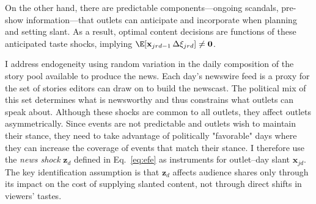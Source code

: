 \documentclass[12pt]{article}
\begin{document}
On the other hand, there are predictable components—ongoing scandals, pre-show information—that outlets can anticipate and incorporate when planning and setting slant. As a result,  optimal content decisions are functions of these anticipated taste shocks, implying $\E[\mathbf{x}_{jrd-1}\,\Delta\xi_{jrd}] \neq \mathbf{0}$.





I address endogeneity using random variation in the daily composition of the story pool available to produce the news. Each day’s newswire feed is a proxy for the set of stories editors can draw on to build the newscast. The political mix of this set determines what is newsworthy and thus constrains what outlets can speak about. Although these shocks are common to all outlets, they affect outlets asymmetrically. Since events are not predictable and outlets wish to maintain their stance, they need to take advantage of politically "favorable" days where they can increase the coverage of events that match their stance. I therefore use the \emph{news shock} $\mathbf{z}_d$ defined in Eq.~\eqref{eq:efe} as instruments for outlet–day slant $\mathbf{x}_{jd}$. The key identification assumption is that $\mathbf{z}_d$ affects audience shares only through its impact on the cost of supplying slanted content, not through direct shifts in viewers’ tastes.



\end{document}
